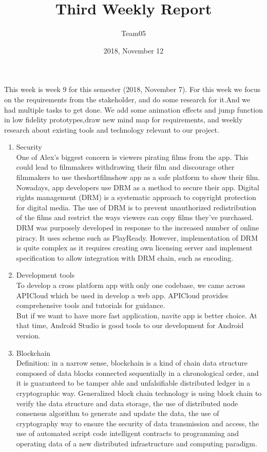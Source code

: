 \documentclass[12pt, letterpaper]{article}
\title{Third Weekly Report}
\author{Team05}
\date{2018, November 12}
\begin{document}
\begin{titlepage}
\maketitle
\end{titlepage}

This week is week 9 for this semester (2018, November 7). For this week we focus on the requirements from the stakeholder, and do some research for it.And we had multiple tasks to get done. We add some animation effects and jump function in low fidelity prototypes,draw new mind map for requirements, and weekly research about existing tools and technology relevant to our project.\\

\begin{enumerate}[1.]
  \item Security\cite{bitmovin}\\
  One of Alex’s biggest concern is viewers pirating films from the app. This could lead to filmmakers withdrawing their film and discourage other filmmakers to use theshortfilmshow app as a safe platform to show their film. Nowadays, app developers use DRM as a method to secure their app. Digital rights management (DRM) is a systematic approach to copyright protection for digital media. The use of DRM is to prevent unauthorized redistribution of the films and restrict the ways viewers can copy films they've purchased. DRM was purposely developed in response to the increased number of online piracy. It uses scheme such as PlayReady. However, implementation of DRM is quite complex as it requires creating own licensing server and implement specification to allow integration with DRM chain, such as encoding.\\
  \item Development tools\cite{APICloud}\\
  To develop a cross platform app with only one codebase, we came across APICloud which be used in develop a web app. APICloud provides comprehensive tools and tutorials for guidance.\\
  But if we want to have more fast application, navite app is better choice. At that time, Android Studio is good tools to our development for Android version.\\
  \item Blockchain\cite{blockchain}\\
  Definition: in a narrow sense, blockchain is a kind of chain data structure composed of data blocks connected sequentially in a chronological order, and it is guaranteed to be tamper able and unfalsifiable distributed ledger in a cryptographic way. Generalized block chain technology is using block chain to verify the data structure and data storage, the use of distributed node consensus algorithm to generate and update the data, the use of cryptography way to ensure the security of data transmission and access, the use of automated script code intelligent contracts to programming and operating data of a new distributed infrastructure and computing paradigm.\\


\end{enumerate}
\end{document}
